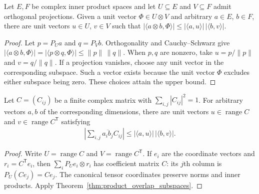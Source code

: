 \begin{theorem}
    \label{thm:product_overlap_subspaces}
    \leanok
    Let $E,F$ be complex inner product spaces and let $U\subseteq E$ and
    $V\subseteq F$ admit orthogonal projections. Given a unit vector
    $\Phi\in U\otimes V$ and arbitrary $a\in E$, $b\in F$, there are
    unit vectors $u\in U$, $v\in V$ such that
    $|\langle a\otimes b,\Phi\rangle|
        \le |\langle a,u\rangle|\,|\langle b,v\rangle|$.
\end{theorem}
\begin{proof}\leanok
    Let $p=P_Ua$ and $q=P_Vb$. Orthogonality and Cauchy--Schwarz give
    $|\langle a\otimes b,\Phi\rangle|
        =|\langle p\otimes q,\Phi\rangle|\le\|p\|\,\|q\|$.
    When $p,q$ are nonzero, take $u=p/\|p\|$ and $v=q/\|q\|$.
    If a projection vanishes, choose any unit vector in the corresponding
    subspace. Such a vector exists because the unit vector $\Phi$ excludes
    either subspace being zero. These choices attain the upper bound.
\end{proof}

\begin{theorem}
    \label{thm:product_overlap_matrix_ranges}
    \leanok
    Let $C=(C_{ij})$ be a finite complex matrix with
    $\sum_{i,j}|C_{ij}|^2=1$. For arbitrary vectors $a,b$ of the corresponding
    dimensions, there are unit vectors $u\in\operatorname{range} C$ and
    $v\in\operatorname{range} C^{\mathsf T}$ satisfying
    \begin{align}
        \label{eq:product_overlap_matrix_ranges}
        \left|\sum_{i,j}\overline{a_i b_j}C_{ij}\right|
        \le |\langle a,u\rangle|\,|\langle b,v\rangle|.
    \end{align}
\end{theorem}
\begin{proof}\leanok
    Write $U=\operatorname{range} C$ and $V=\operatorname{range} C^{\mathsf T}$.
    If $e_i$ are the coordinate vectors and $r_i=C^{\mathsf T}e_i$, then
    $\sum_iP_Ue_i\otimes r_i$ has coefficient matrix $C$: its $j$th column
    is $P_U(Ce_j)=Ce_j$. The canonical tensor coordinates preserve norms
    and inner products. Apply Theorem~\ref{thm:product_overlap_subspaces}.
\end{proof}

